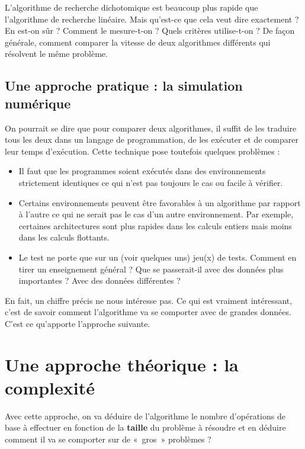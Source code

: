 		L’algorithme de recherche dichotomique 
		est beaucoup plus rapide que l’algorithme de recherche linéaire. 
		Mais qu’est-ce que cela veut dire exactement ? 
		En est-on sûr ? 
		Comment le mesure-t-on ? 
		Quels critères utilise-t-on ?
		De façon générale, comment comparer la vitesse
		de deux algorithmes différents qui résolvent le même problème.
		
		\subsection{Une approche pratique : la simulation numérique}
	
			On pourrait se dire que pour comparer deux algorithmes, 
			il suffit de les traduire tous les deux 
			dans un langage de programmation, 
			de les exécuter et de comparer leur temps d’exécution. 
			Cette technique pose toutefois quelques problèmes :			
			\begin{itemize}
				\item 
					Il faut que les programmes soient exécutés 
					dans des environnements strictement identiques 
					ce qui n’est pas toujours le cas ou facile à vérifier.
				\item
					Certains environnements peuvent être favorables
					à un algorithme par rapport à l'autre
					ce qui ne serait pas le cas d'un autre environnement.
					Par exemple, certaines architectures
					sont plus rapides dans les calculs entiers
					mais moins dans les calculs flottants.
				\item 
					Le test ne porte que sur un (voir quelques uns) jeu(x) de tests. 
					Comment en tirer un enseignement général ? 
					Que se passerait-il avec des données plus importantes ? 
					Avec des données différentes ?
			\end{itemize}		
			En fait, un chiffre précis ne nous intéresse pas. 
			Ce qui est vraiment intéressant,
			c'est de savoir comment l'algorithme va se comporter
			avec de grandes données.
			C'est ce qu'apporte l'approche suivante.
		
		\section{Une approche théorique : la complexité}
		
			Avec cette approche,
			on va déduire de l'algorithme
			le nombre d’opérations de base à effectuer
			en fonction de la \textbf{taille} du problème à résoudre
			et en déduire 
			comment il va se comporter sur de «~gros~» problèmes ?
		
